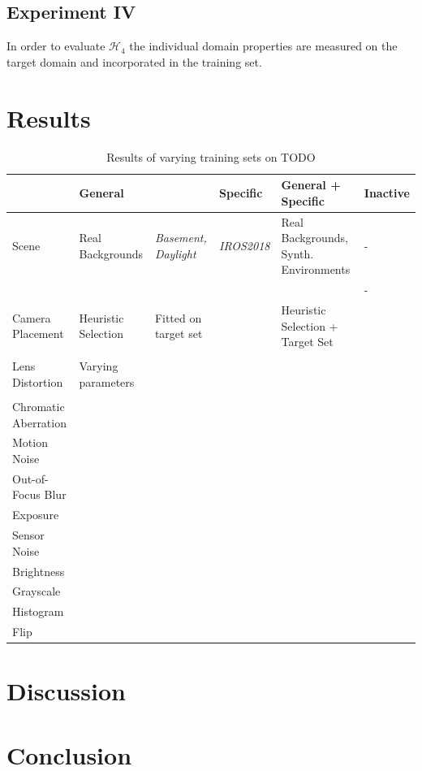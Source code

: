 \subsection{Experiment IV}

In order to evaluate $\mathcal{H}_4$ the individual domain properties are measured on the target domain and incorporated in the training set.


\section{Results}
\label{sec:training:results}
\begin{table}[htbp]
	\caption{Results of varying training sets on TODO}
	\small
	\begin{tabular}{|p{3cm}|p{2cm}|p{2cm}|p{2cm}|p{3cm}|p{2cm}|}
		\hline
		& General &  & Specific & General + Specific & Inactive \\ \hline
		Scene & Real Backgrounds & \textit{Basement, Daylight} & \textit{IROS2018} & Real Backgrounds, Synth. Environments & - \\ \hline
		&  &  &  &  & - \\ \hline
		Camera Placement & Heuristic Selection & Fitted on target set &  & Heuristic Selection + Target Set &  \\ \hline
		&  &  &  &  &  \\ \hline
		Lens Distortion & Varying parameters &  &  &  &  \\ \hline
		&  &  &  &  &  \\ \hline
		Chromatic Aberration &  &  &  &  &  \\ \hline
		Motion Noise &  &  &  &  &  \\ \hline
		Out-of-Focus Blur &  &  &  &  &  \\ \hline
		Exposure &  &  &  &  &  \\ \hline
		Sensor Noise &  &  &  &  &  \\ \hline
		Brightness &  &  &  &  &  \\ \hline
		Grayscale &  &  &  &  &  \\ \hline
		Histogram &  &  &  &  &  \\ \hline
		Flip &  &  &  &  &  \\ \hline
	\end{tabular}
	\label{genvsspec}
\end{table}


\section{Discussion}
\label{sec:training:discussion}

\section{Conclusion}
\label{sec:training:conclusion}


